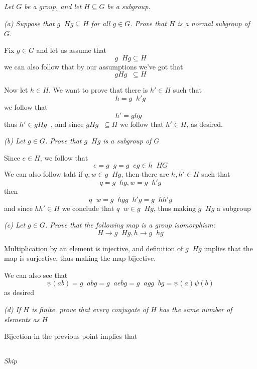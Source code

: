 \documentclass[11pt,oneside,titlepage]{book}
\DeclareMathOperator \inv {^{-1}}
\begin{document}
\subsection{}

\textit{Let $G$ be a group, and let $H \subseteq G$ be a subgroup.}

\textit{(a) Suppose that $g\inv H g \subseteq H$ for all $g \in G$.
  Prove that $H$ is a normal subgroup of $G$.}

Fix $g \in G$ and let us assume that
$$g\inv H g \subseteq H$$
we can also follow that by our assumptions we've got that
$$g H g\inv \subseteq H$$

Now let $h \in H$. We want to prove that there is $h' \in H$
such that
$$h = g\inv h' g$$
we follow that
$$h' = g h g\inv$$
thus $h' \in g H g\inv$, and since $g H g\inv \subseteq H$ we follow that
$h' \in H$, as desired.

\textit{(b) Let $g \in G$. Prove that $g\inv H g$ is a subgroup of $G$}

Since $e \in H$, we follow that
$$e = g\inv g = g\inv e g \in h\inv H G$$
We can also follow taht if $q, w \in g\inv H g$, then
there are $h, h' \in H$ such that
$$q = g\inv h g, w = g\inv h' g$$
then
$$q\inv w = g\inv h g g\inv h' g = g\inv h h' g$$
and since $h h' \in H$ we conclude that $q\inv w \in g\inv H g$, thus making
$g\inv H g$ a subgroup

\textit{(c) Let $g \in G$. Prove that the following map is a group
  isomorphism:
  $$H \to g\inv H g, h \to g\inv h g$$
}

Multiplication by an element is injective, and definition of $g\inv H
g$ implies that the map is surjective, thus making the map bijective.

We can also see that
$$\psi(a b) = g\inv a b g = g \inv a e b g = g \inv a g g\inv  b g = \psi(a) \psi(b)$$
as desired

\textit{(d) If $H$ is finite. prove that every conjugate of $H$ has
  the same number of elements as $H$}

Bijection in the previous point implies that

\subsection{}

\textit{Skip}

\subsection{}
\end{document}
